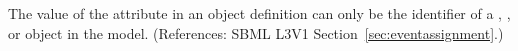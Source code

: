 The value of the  attribute in an \EventAssignment object
definition can only be the identifier of a \Compartment, \Species,
\Parameter or \SpeciesReference object in the model.  (References: SBML
L3V1 Section~\ref{sec:eventassignment}.)
